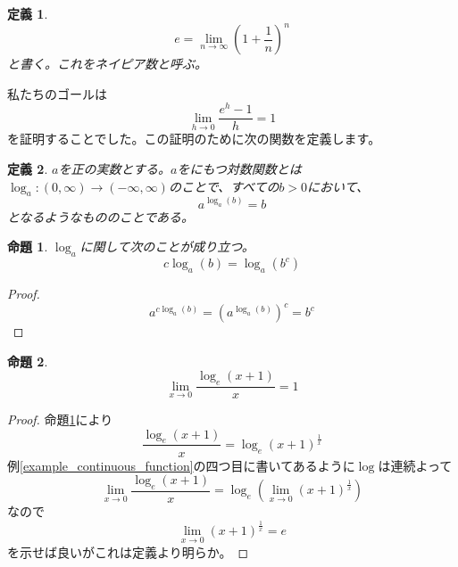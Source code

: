 \documentclass{ltjsarticle}
\newtheorem{proposition}{命題}[section]
\newtheorem{definition}{定義}[section]
\begin{document}
\begin{definition}
\begin{equation*}
e=\lim_{n\to\infty}\left(1+{\frac 1 n}\right)^n
\end{equation*}
と書く。これをネイピア数と呼ぶ。
\end{definition}
私たちのゴールは
\begin{equation*}
\lim_{h\to0}{\frac {e^h-1} h}=1
\end{equation*}
を証明することでした。この証明のために次の関数を定義します。
\begin{definition}
$a$を正の実数とする。$a$をにもつ対数関数とは$\log_a:(0,\infty)\to (-\infty,\infty)$のことで、すべての$b>0$において、
\begin{equation*}
a^{\log_a(b)} = b
\end{equation*}
となるようなもののことである。
\end{definition}
\begin{proposition}
\label{proposition_log_power}
$\log_a$に関して次のことが成り立つ。
\begin{equation*}
c\log_a(b) = \log_a(b^c)
\end{equation*}
\end{proposition}
\begin{proof}
\begin{equation*}
a^{c\log_a(b)} = (a^{\log_a(b)})^c = b^c
\end{equation*}
\end{proof}
\begin{proposition}
\begin{equation*}
\lim_{x\to0}{\frac {\log_e(x+1)} x} = 1
\end{equation*}
\label{proposition_x_log_limit}
\end{proposition}
\begin{proof}
命題\ref{proposition_log_power}により
\begin{equation*}
{\frac {\log_e(x+1)} x} = \log_e(x+1)^{{\frac 1 x}}
\end{equation*}
例\ref{example_continuous_function}の四つ目に書いてあるように$\log$は連続よって
\begin{equation*}
\lim_{x\to0}{\frac {\log_e(x+1)} x}  = \log_e\left(\lim_{x\to0}(x+1)^{{\frac 1 x}}\right)
\end{equation*}
なので
\begin{equation*}
\lim_{x\to0}(x+1)^{{\frac 1 x}}=e
\end{equation*}
を示せば良いがこれは定義より明らか。
\end{proof}
\end{document}

